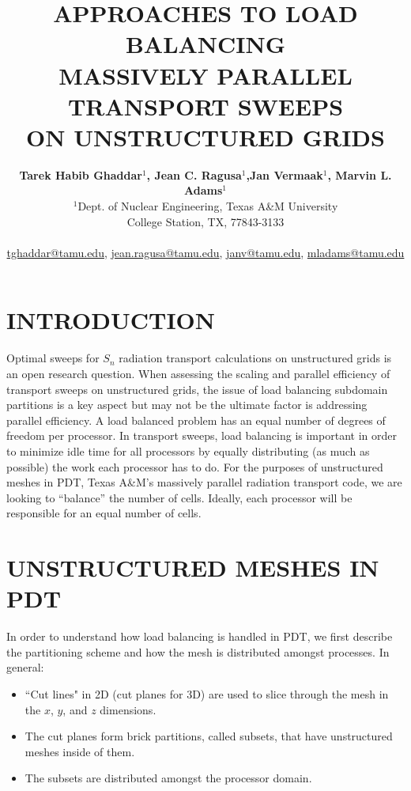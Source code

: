 \documentclass[letterpaper]{mandc2019}
\title{APPROACHES TO LOAD BALANCING \\
MASSIVELY PARALLEL TRANSPORT SWEEPS \\
 ON UNSTRUCTURED GRIDS}
\author{%
  \textbf{Tarek Habib Ghaddar$^1$, Jean C. Ragusa$^1$,Jan Vermaak$^1$, Marvin L. Adams$^1$}\\%
  $^1$Dept. of Nuclear Engineering, Texas  A\&M University \\
  College Station, TX, 77843-3133 \\ 
\\
  \url{tghaddar@tamu.edu}, \url{jean.ragusa@tamu.edu}, \url{janv@tamu.edu}, \url{mladams@tamu.edu}
}
\begin{document}
\maketitle
\justify 

\section{INTRODUCTION} 
Optimal sweeps for $S_n$ radiation transport calculations on unstructured grids is an open research question. When assessing the scaling and parallel efficiency of transport sweeps on unstructured grids, the issue of load balancing  subdomain partitions is a key aspect but may not be the ultimate factor is addressing parallel efficiency. A load balanced problem has an equal number of degrees of freedom per processor. In transport sweeps, load balancing is important in order to minimize idle time for all processors by equally distributing (as much as possible) the work each processor has to do.  For the purposes of unstructured meshes in PDT, Texas A\&M's massively parallel radiation transport code, we are looking to ``balance'' the number of cells. Ideally, each processor will be responsible for an equal number of cells. 

\section{UNSTRUCTURED MESHES IN PDT} 
\label{sec:first}

In order to understand how load balancing is handled in PDT, we first describe the partitioning scheme and how the mesh is distributed amongst processes.  In general:
\vspace{-0.6cm}
\begin{itemize}\itemsep 1pt \parskip 0pt \parsep 0pt
\item ``Cut lines" in 2D (cut planes for 3D) are used to slice through the mesh in the $x$, $y$, and $z$ dimensions.
\item The cut planes form brick partitions, called subsets, that have unstructured meshes inside of them. 
\item The subsets are distributed amongst the processor domain.
\end{itemize}
\vspace{-0.6cm}
\end{document}
